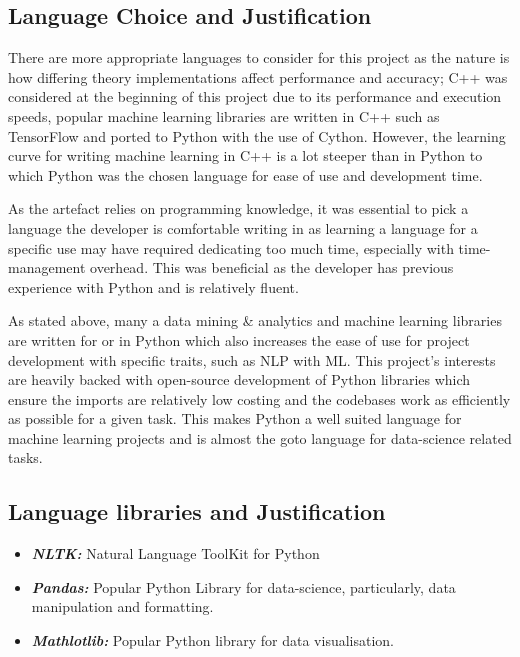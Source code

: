 \subsection{Language Choice and Justification}

There are more appropriate languages to consider for this project as the nature is how differing theory implementations affect performance and accuracy; C++ was considered at the beginning of this project due to its performance and execution speeds, popular machine learning libraries are written in C++ such as TensorFlow and ported to Python with the use of Cython. However, the learning curve for writing machine learning in C++ is a lot steeper than in Python to which Python was the chosen language for ease of use and development time.

As the artefact relies on programming knowledge, it was essential to pick a language the developer is comfortable writing in as learning a language for a specific use may have required dedicating too much time, especially with time-management overhead. This was beneficial as the developer has previous experience with Python and is relatively fluent.

As stated above, many a data mining \& analytics and machine learning libraries are written for or in Python which also increases the ease of use for project development with specific traits, such as NLP with ML. This project's interests are heavily backed with open-source development of Python libraries which ensure the imports are relatively low costing and the codebases work as efficiently as possible for a given task. This makes Python a well suited language for machine learning projects and is almost the goto language for data-science related tasks. \newpage

\subsection{Language libraries and Justification}

\begin{itemize}
    \item \textbf{\textit{NLTK:}} Natural Language ToolKit for Python
    \item \textbf{\textit{Pandas:}} Popular Python Library for data-science, particularly, data manipulation and formatting.
    \item \textbf{\textit{Mathlotlib:}} Popular Python library for data visualisation.
\end{itemize}



